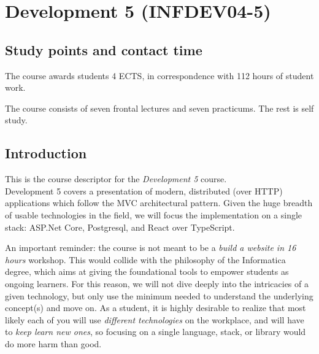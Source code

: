 \makeatother
\sloppy 
\hypersetup{
breaklinks=true,  %
colorlinks=true,
urlcolor=urlcolor,
linkcolor=linkcolor,
citecolor=citecolor,
}
%
\section{Development 5 (INFDEV04-5)}\label{development-5-infdev04-5}

\subsection{Study points and contact
time}\label{study-points-and-contact-time}

The course awards students 4 ECTS, in correspondence with 112 hours of
student work.

The course consists of seven frontal lectures and seven practicums. The
rest is self study. 

\subsection{Introduction}\label{introduction}

This is the course descriptor for the \emph{Development 5} course.
\\
Development 5 covers a presentation of modern, distributed (over HTTP)
applications which follow the MVC architectural pattern. Given the huge
breadth of usable technologies in the field, we will focus the
implementation on a single stack: ASP.Net Core, Postgresql, and React
over TypeScript.

An important reminder: the course is not meant to be a \emph{build a
website in 16 hours} workshop. This would collide with the philosophy of
the Informatica degree, which aims at giving the foundational tools to
empower students as ongoing learners. For this reason, we will not dive
deeply into the intricacies of a given technology, but only use the
minimum needed to understand the underlying concept(s) and move on. As a
student, it is highly desirable to realize that most likely each of you
will use \emph{different technologies} on the workplace, and will have
to \emph{keep learn new ones}, so focusing on a single language, stack,
or library would do more harm than good.

